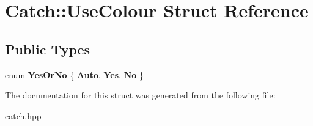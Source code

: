 \hypertarget{structCatch_1_1UseColour}{}\section{Catch\+:\+:Use\+Colour Struct Reference}
\label{structCatch_1_1UseColour}
\subsection*{Public Types}
\begin{DoxyCompactItemize}
\item 
\mbox{\label{structCatch_1_1UseColour_a6aa78da0c2de7539bb9e3757e204a3f1}} 
enum {\bfseries Yes\+Or\+No} \{ {\bfseries Auto}, 
{\bfseries Yes}, 
{\bfseries No}
 \}
\end{DoxyCompactItemize}


The documentation for this struct was generated from the following file\+:\begin{DoxyCompactItemize}
\item 
catch.\+hpp\end{DoxyCompactItemize}
